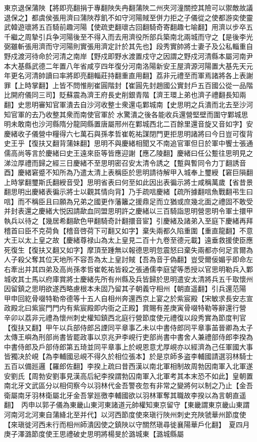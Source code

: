 東京退保蒲陜【將即亮翻捐于專翻陜失冉翻蒲陜二州夾河潼關控其險可以禦敵故議退保之】都虞侯張用濟曰蒲陜荐飢不如守河陽賊至併力拒之子儀從之使都游奕使靈武韓遊瓌將五百騎前趣河陽【使疏吏翻瓌古回翻騎奇寄翻趣七喻翻】用濟以步卒五千繼之周摯引兵争河陽後至不得入而去用濟役所部兵築南北兩城而守之【是後李光弼雖斬張用濟而守河陽則實張用濟定計於其先也】段秀實帥將士妻子及公私輜重自野戍渡河待命於河清之南岸【野戍即野水渡置戍守之因謂之野戍河清縣本屬河南尹本大基縣武德二年置八年省咸亨四年復分河南洛陽新安王屋濟源河陽置大基先天元年更名河清帥讀曰率將即亮翻輜莊持翻重直用翻】荔非元禮至而軍焉諸將各上表謝罪【上時掌翻】上皆不問惟削崔圓階封【崔圓先封趙國公實封戶五百國公從一品階比開府儀同三司】貶蘇震為濟王府長史削銀青階【濟王環上弟也濟子禮翻長知兩翻】史思明審知官軍潰去自沙河收整士衆還屯鄴城南【史思明之兵潰而北去至沙河知官軍的去乃收整其衆而南使官軍於水驚潰之後各能收兵還營堅壁而圍守鄴城思明未敢南也沙河縣隋分龍岡縣置唐屬邢州在鄴城西北二百餘里還音旋又音如字】安慶緒收子儀營中糧得六七萬石與孫孝哲崔乾祐謀閉門更拒思明諸將曰今日豈可復背史王乎【復扶又翻背蒲妹翻】思明不與慶緒相聞又不南追官軍但日於軍中饗士張通儒高尚等言於慶緒曰史王遠來臣等皆應迎謝【應乙陵翻】慶緒曰任公蹔往思明見之涕泣厚禮而歸之經三日慶緒不至思明密召安太清令誘之【蹔與暫同令力丁翻誘音酉】慶緒窘蹙不知所為乃遣太清上表稱臣於思明請待解甲入城奉上璽綬【窘巨隕翻上時掌翻璽斯氏翻綬音受】思明省表曰何至如此因出表徧示將士咸稱萬歲【省昔景翻思明出慶緒表徧示將士以觀其情向背】乃手疏唁慶緒【疏所據翻唁魚戰翻弔生曰唁】而不稱臣且曰願為兄弟之國更作藩籬之援鼎足而立猶或庶幾北面之禮固不敢受并封表還之慶緒大悦因請歃血同盟思明許之慶緒以三百騎詣思明營思明令軍士擐甲執兵以待之【幾居希翻歃色甲翻騎奇計翻擐音宦】引慶緒及諸弟入至庭下慶緒再拜稽首曰臣不克荷負【稽音啓荷下可翻又如字】棄失兩都久陷重圍【重直龍翻】不意大王以太上皇之故【慶緒尊禄山為太上皇見二百十九卷至德元載】遠垂救援使臣應死復生【復扶又翻又如字】摩頂至踵無以報德思明忽震怒曰棄失兩都亦何足言爾為人子殺父奪其位天地所不容吾為太上皇討賊【吾為音于偽翻】豈受爾佞媚乎即命左右牽出并其四弟及高尚孫孝哲崔乾祐皆殺之張通儒李庭望等悉授以官思明勒兵入鄴城收其士馬以府庫賞將士慶緒先所有州縣及兵皆歸於思明遣安太清將兵五千取懷州因留鎮之思明欲遂西略慮根本未固乃留其子朝義守相州【朝直遥翻】引兵還范陽　甲申回紇骨啜特勒帝德等十五人自相州奔還西京上宴之於紫宸殿【宋敏求長安志宣政殿北曰紫宸門門内有紫宸殿即内衙之正殿】賞賜有差庚寅骨啜特勒等辭還行營　辛卯以荔非元禮為懷州刺史權知鎮西北庭行營節度使元禮復以段秀實為節度判官【復扶又翻】甲午以兵部侍郎呂諲同平章事乙未以中書侍郎同平章事苖晉卿為太子太傳王嶼為刑部尚書皆罷政事以京兆尹李峴行吏部尚書中書舍人兼禮部侍郎李揆為中書侍郎及戶部侍郎第五琦並同平章事上於峴恩意尤厚峴亦以經濟為己任軍國大事皆獨决於峴【為李輔國忌峴不得久於相位張本】於是京師多盗李輔國請選羽林騎士五百以備廵邏【羅郎佐翻】李揆上疏曰昔西漢以南北軍相制故周勃因南軍入北軍遂安劉氏【周勃安劉事見漢高后紀李揆謂勃囚南軍入北軍考其本末恐不如此】皇朝置南北牙文武區分以相伺察今以羽林代金吾警夜忽有非常之變將何以制之乃止【金吾衛屬南牙羽林衛屬北牙金吾掌廵徼李輔國欲以羽林軍奪其職故李揆以為言朝直遥翻】　丙申以郭子儀為東畿山東河東諸道元帥權知東京留守【東畿謂東京畿山東謂河南河北河東自蒲絳北至并代】以河西節度使來瑱行陜州刺史充陜虢華州節度使【來瑱徙河西未行而相州師潰因使之鎮陜以守關然瑱尋徙襄陽華戶化翻】　夏四月庚子澤潞節度使王思禮破史思明將楊旻於潞城東【潞城縣屬